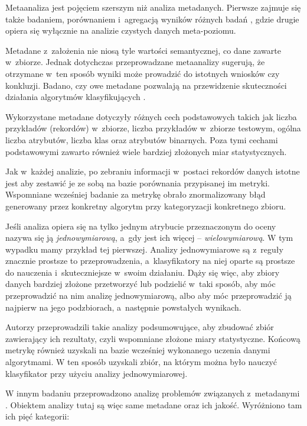 	Metaanaliza jest pojęciem szerszym niż analiza metadanych.
	Pierwsze zajmuje się także badaniem, porównaniem i~agregacją wyników różnych badań \cite{rosenthal2002meta}, gdzie drugie opiera się wyłącznie na analizie czystych danych meta-poziomu.

	Metadane z~założenia nie niosą tyle wartości semantycznej, co dane zawarte w~zbiorze.
	Jednak dotychczas przeprowadzane metaanalizy sugerują, że otrzymane w~ten sposób wyniki może prowadzić do istotnych wniosków czy konkluzji.
	Badano, czy owe metadane pozwalają na przewidzenie skuteczności działania algorytmów klasyfikujących \cite{brazdil1994characterizing}.

	Wykorzystane metadane dotyczyły różnych cech podstawowych takich jak liczba przykładów (rekordów) w~zbiorze, liczba przykładów w~zbiorze testowym, ogólna liczba atrybutów, liczba klas oraz atrybutów binarnych. Poza tymi cechami podstawowymi zawarto również wiele bardziej złożonych miar statystycznych.

	Jak w~każdej analizie, po zebraniu informacji w~postaci rekordów danych istotne jest aby zestawić je ze sobą na bazie porównania przypisanej im metryki.
	Wspomniane wcześniej badanie \cite{brazdil1994characterizing} za metrykę obrało znormalizowany błąd generowany przez konkretny algorytm przy kategoryzacji konkretnego zbioru.

	Jeśli analiza opiera się na tylko jednym atrybucie przeznaczonym do oceny nazywa się ją \emph{jednowymiarową}, a~gdy jest ich więcej -- \emph{wielowymiarową}.
	W tym wypadku mamy przykład tej pierwszej.
	Analizy jednowymiarowe są z~reguły znacznie prostsze to przeprowadzenia, a~klasyfikatory na niej oparte są prostsze do nauczenia i~skuteczniejsze w~swoim działaniu.
	Dąży się więc, aby zbiory danych bardziej złożone przetworzyć lub podzielić w~taki sposób, aby móc przeprowadzić na nim analizę jednowymiarową, albo aby móc przeprowadzić ją najpierw na jego podzbiorach, a~następnie powstałych wynikach.

	Autorzy przeprowadzili takie analizy podsumowujące, aby zbudować zbiór zawierający ich rezultaty, czyli wspomniane złożone miary statystyczne.
	Końcową metrykę również uzyskali na bazie wcześniej wykonanego uczenia danymi algorytmami.
	W ten sposób uzyskali zbiór, na którym można było nauczyć klasyfikator przy użyciu analizy jednowymiarowej.

	W innym badaniu przeprowadzono analizę problemów związanych z~metadanymi \cite{yasser2011analysis}.
	Obiektem analizy tutaj są więc same metadane oraz ich jakość.
	Wyróżniono tam ich pięć kategorii:

